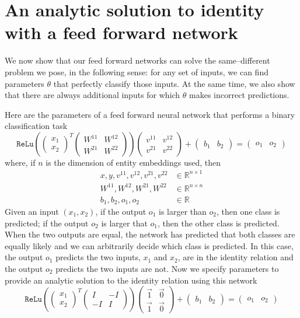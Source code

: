 \section{An analytic solution to identity with a feed forward network}\label{app:equality-solution}

We now show that our feed forward networks can solve the same--different problem we pose, in the following sense: for any set of inputs, we can find parameters $\theta$ that perfectly classify those inputs. At the same time, we also show that there are always additional inputs for which $\theta$ makes incorrect predictions.

Here are the parameters of a feed forward neural network that performs a binary classification task
%
\[ \texttt{ReLu}(\begin{pmatrix} x_1 \\ x_2  \end{pmatrix}^T \begin{pmatrix} W^{11} & W^{12}\\ W^{21}& W^{22} \end{pmatrix}) \begin{pmatrix} v^{11} & v^{12} \\ v^{21} & v^{22} \end{pmatrix} + \begin{pmatrix}b_1 &b_2 \end{pmatrix}= \begin{pmatrix} o_1 & o_2\end{pmatrix}\]
%
where, if $n$ is the dimension of entity embeddings used, then
%
\begin{align*}
  x, y,v^{11}, v^{12}, v^{21}, v^{22} &\in \mathbb{R}^{n \times 1} \\
  W^{11}, W^{12},W^{21}, W^{22} &\in \mathbb{R}^{n \times n} \\
  b_1, b_2, o_1, o_2 &\in \mathbb{R}
\end{align*}
%
Given an input $(x_1,x_2)$, if the output $o_1$ is larger than $o_2$, then one class is predicted; if the output $o_2$ is larger that $o_1$, then the other class is predicted. When the two outputs are equal, the network has predicted that both classes are equally likely and we can arbitrarily decide which class is predicted. In this case, the output $o_1$ predicts the two inputs, $x_1$ and $x_2$, are in the identity relation and the output $o_2$ predicts the two inputs are not. Now we specify parameters to provide an analytic solution to the identity relation using this network
%
\[ \texttt{ReLu}(\begin{pmatrix} x_1 \\ x_2 \end{pmatrix}^T \begin{pmatrix} I & -I\\ -I& I \end{pmatrix}) \begin{pmatrix} \vec{1} & \vec{0} \\ \vec{1} & \vec{0} \end{pmatrix} + \begin{pmatrix}b_1 &b_2 \end{pmatrix}= \begin{pmatrix} o_1 & o_2\end{pmatrix}\]
